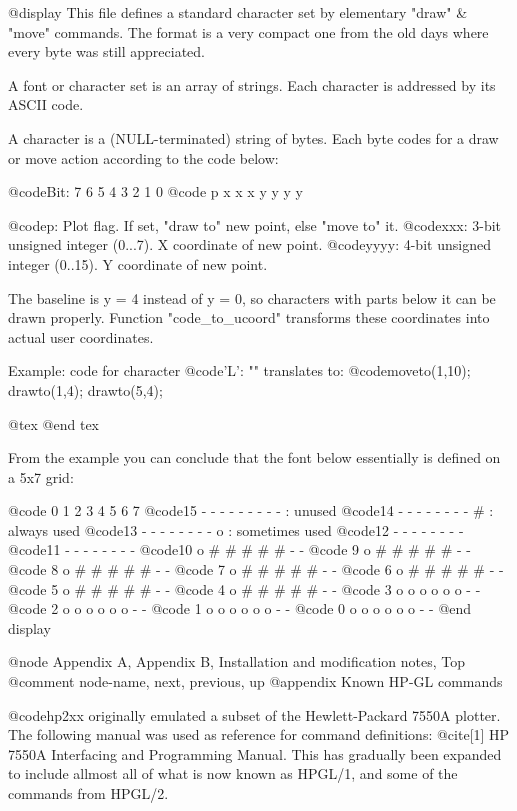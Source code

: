 @display
 This file defines a standard character set by elementary
 "draw" & "move" commands. The format is a very compact one from
 the old days where every byte was still appreciated.

 A font or character set is an array of strings. Each character is
 addressed by its ASCII code.

 A character is a (NULL-terminated) string of bytes. Each byte
 codes for a draw or move action according to the code below:

     @code{Bit: 7 6 5 4 3 2 1 0}
     @code{     p x x x y y y y}

 @code{p:   } Plot flag. If set, "draw to" new point, else "move to" it.
 @code{xxx: } 3-bit unsigned integer  (0...7). X coordinate of new point.
 @code{yyyy:} 4-bit unsigned integer (0..15). Y coordinate of new point.

 The baseline is y = 4 instead of y = 0, so characters with parts
 below it can be drawn properly. Function "code_to_ucoord" transforms
 these coordinates into actual user coordinates.

 Example:  code for character @code{'L': ""} translates to:
           @code{moveto(1,10); drawto(1,4); drawto(5,4);}

@tex
\page
@end tex

 From the example you can conclude that the font below essentially is
 defined on a 5x7 grid:

     @code{    0 1 2 3 4 5 6 7}
     @code{15  - - - - - - - -     - : unused}
     @code{14  - - - - - - - -     # : always used}
     @code{13  - - - - - - - -     o : sometimes used}
     @code{12  - - - - - - - -}
     @code{11  - - - - - - - -}
     @code{10  o # # # # # - -}
     @code{ 9  o # # # # # - -}
     @code{ 8  o # # # # # - -}
     @code{ 7  o # # # # # - -}
     @code{ 6  o # # # # # - -}
     @code{ 5  o # # # # # - -}
     @code{ 4  o # # # # # - -}
     @code{ 3  o o o o o o - -}
     @code{ 2  o o o o o o - -}
     @code{ 1  o o o o o o - -}
     @code{ 0  o o o o o o - -}
@end display



@node Appendix A, Appendix B, Installation and modification notes, Top
@comment  node-name,  next,  previous,  up
@appendix   Known HP-GL commands

@code{hp2xx} originally emulated a subset of the Hewlett-Packard 7550A plotter.
The following manual was used as reference for command definitions:
@cite{[1] HP 7550A Interfacing and Programming Manual}. This has gradually
been expanded to include allmost all of what is now known as HPGL/1, and
some of the commands from HPGL/2.

